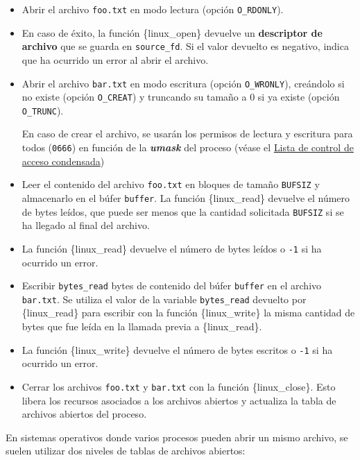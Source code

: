 \begin{itemize}
\item
  Abrir el archivo \texttt{foo.txt} en modo lectura (opción
  \texttt{O\_RDONLY}).
\item
  En caso de éxito, la función \{linux\_open\} devuelve un
  \textbf{descriptor de archivo} que se guarda en \texttt{source\_fd}.
  Si el valor devuelto es negativo, indica que ha ocurrido un error al
  abrir el archivo.
\item
  Abrir el archivo \texttt{bar.txt} en modo escritura (opción
  \texttt{O\_WRONLY}), creándolo si no existe (opción \texttt{O\_CREAT})
  y truncando su tamaño a 0 si ya existe (opción \texttt{O\_TRUNC}).

  En caso de crear el archivo, se usarán los permisos de lectura y
  escritura para todos (\texttt{0666}) en función de la
  \textbf{\emph{umask}} del proceso (véase el
  \hyperref[acl_condensada]{Lista de control de acceso condensada})
\item
  Leer el contenido del archivo \texttt{foo.txt} en bloques de tamaño
  \texttt{BUFSIZ} y almacenarlo en el búfer \texttt{buffer}. La función
  \{linux\_read\} devuelve el número de bytes leídos, que puede ser
  menos que la cantidad solicitada \texttt{BUFSIZ} si se ha llegado al
  final del archivo.
\item
  La función \{linux\_read\} devuelve el número de bytes leídos o
  \texttt{-1} si ha ocurrido un error.
\item
  Escribir \texttt{bytes\_read} bytes de contenido del búfer
  \texttt{buffer} en el archivo \texttt{bar.txt}. Se utiliza el valor de
  la variable \texttt{bytes\_read} devuelto por \{linux\_read\} para
  escribir con la función \{linux\_write\} la misma cantidad de bytes
  que fue leída en la llamada previa a \{linux\_read\}.
\item
  La función \{linux\_write\} devuelve el número de bytes escritos o
  \texttt{-1} si ha ocurrido un error.
\item
  Cerrar los archivos \texttt{foo.txt} y \texttt{bar.txt} con la función
  \{linux\_close\}. Esto libera los recursos asociados a los archivos
  abiertos y actualiza la tabla de archivos abiertos del proceso.
\end{itemize}

En sistemas operativos donde varios procesos pueden abrir un mismo
archivo, se suelen utilizar dos niveles de tablas de archivos abiertos:

